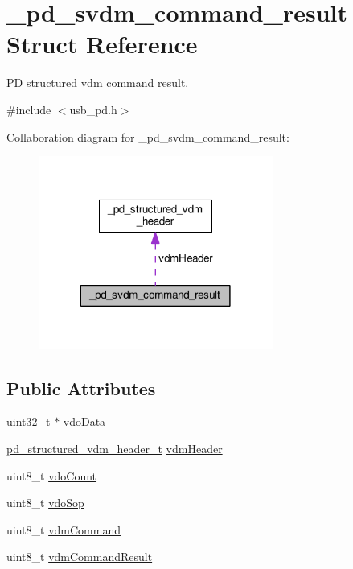 \hypertarget{struct__pd__svdm__command__result}{\section{\-\_\-pd\-\_\-svdm\-\_\-command\-\_\-result Struct Reference}
\label{struct__pd__svdm__command__result}
}


P\-D structured vdm command result.  




{\ttfamily \#include $<$usb\-\_\-pd.\-h$>$}



Collaboration diagram for \-\_\-pd\-\_\-svdm\-\_\-command\-\_\-result\-:
\nopagebreak
\begin{figure}[H]
\begin{center}
\leavevmode
\includegraphics[width=218pt]{struct__pd__svdm__command__result__coll__graph}
\end{center}
\end{figure}
\subsection*{Public Attributes}
\begin{DoxyCompactItemize}
\item 
uint32\-\_\-t $\ast$ \hyperlink{struct__pd__svdm__command__result_acd15ff8f7fe85b7e8ed891199339053f}{vdo\-Data}
\item 
\hyperlink{group__usb__pd__stack_ga245b8bec3f3b7771e73016ac98595570}{pd\-\_\-structured\-\_\-vdm\-\_\-header\-\_\-t} \hyperlink{struct__pd__svdm__command__result_adc6934994780581eba3edc5b4fe47765}{vdm\-Header}
\item 
uint8\-\_\-t \hyperlink{struct__pd__svdm__command__result_a347c19dd5209bb9ef874aa11caf4c07b}{vdo\-Count}
\item 
uint8\-\_\-t \hyperlink{struct__pd__svdm__command__result_aa65006c48f37577f5cab247b07bb0cdf}{vdo\-Sop}
\item 
uint8\-\_\-t \hyperlink{struct__pd__svdm__command__result_af1f46eb3cd5009b29a5f3ba293a5fc84}{vdm\-Command}
\item 
uint8\-\_\-t \hyperlink{struct__pd__svdm__command__result_af52b0485285dda6a8eda1154989dc84e}{vdm\-Command\-Result}
\end{DoxyCompactItemize}


